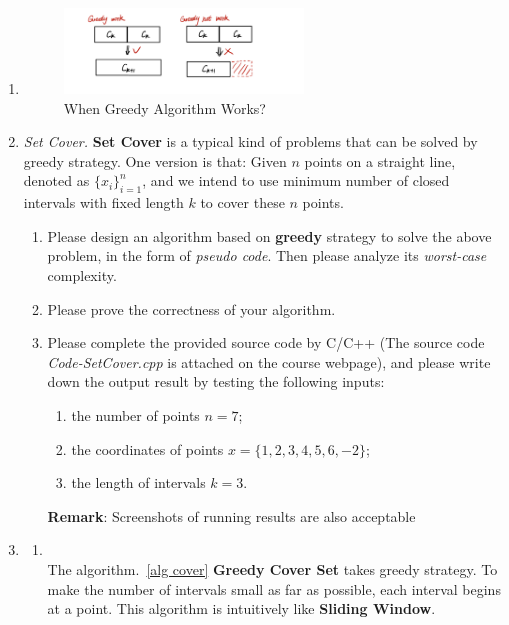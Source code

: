 \documentclass[12pt,a4paper]{article}
\makeatletter
\newtheorem*{solution}{Solution}
\theoremstyle{definition}
\renewenvironment{solution}[1][Solution] {\par\pushQED{\qed}\normalfont\topsep6\p@\@plus6\p@\relax\trivlist\item[\hskip\labelsep\bfseries#1\@addpunct{.}]\ignorespaces}{\popQED\endtrivlist\@endpefalse} \makeatother
\makeatother
\begin{document}
\begin{enumerate}
\begin{solution}
\begin{enumerate}
\begin{figure}[htbp]
    \centering
    \includegraphics[width=0.6\textwidth]{explain.jpg}
    \caption{When Greedy Algorithm Works?}\label{explain}
\end{figure}

\end{enumerate}
    \end{solution}
	
    \item \textit{Set Cover.} \textbf{Set Cover} is a typical kind of problems that can be solved by greedy strategy. One version is that: Given $n$ points on a straight line, denoted as $\{x_i\}_{i=1}^n$, and we intend to use minimum number of closed intervals with fixed length $k$ to cover these $n$ points.
    \begin{enumerate}
    	\item Please design an algorithm based on \textbf{greedy} strategy to solve the above problem, in the form of \emph{pseudo code}. Then please analyze its \emph{worst-case} complexity.
    	\item Please prove the correctness of your algorithm.
    	\item Please complete the provided source code by C/C++ {\color{blue}(The source code \emph{Code-SetCover.cpp} is attached on the course webpage)}, and please write down the output result by testing the following inputs: 
    	\begin{enumerate}
    		\item the number of points $n=7$;
    		\item the coordinates of points
    		$x=\{1,2,3,4,5,6,-2\}$;
    		\item the length of intervals
    		$k=3$.
    	\end{enumerate}
        \textbf{Remark}: Screenshots of running results are also acceptable 
    \end{enumerate}
    
   \begin{solution}
   
\begin{enumerate}
\item
~\\
The algorithm.~\ref{alg cover} \textbf{Greedy Cover Set} takes greedy strategy. To make the number of intervals small as far as possible, each interval begins at a point. This algorithm is intuitively like \textbf{Sliding Window}.


\end{enumerate}
\end{solution}
\end{enumerate}
\end{document}
